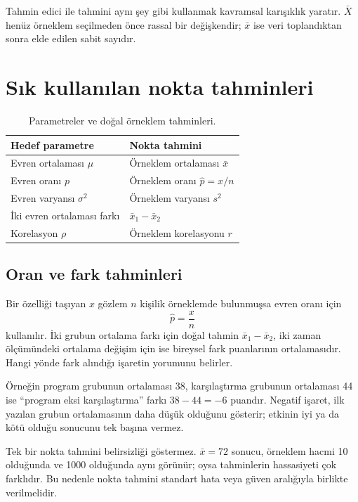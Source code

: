 \begin{mistakebox}
Tahmin edici ile tahmini aynı şey gibi kullanmak kavramsal karışıklık yaratır.
$\bar X$ henüz örneklem seçilmeden önce rassal bir değişkendir; $\bar x$ ise
veri toplandıktan sonra elde edilen sabit sayıdır.
\end{mistakebox}

\section{Sık kullanılan nokta tahminleri}

\begin{table}[htbp]
\centering
\caption{Parametreler ve doğal örneklem tahminleri.}
\begin{tabular}{p{}p{}}
\toprule
Hedef parametre & Nokta tahmini \\
\midrule
Evren ortalaması $\mu$ & Örneklem ortalaması $\bar x$ \\
Evren oranı $p$ & Örneklem oranı $\hat p=x/n$ \\
Evren varyansı $\sigma^2$ & Örneklem varyansı $s^2$ \\
İki evren ortalaması farkı & $\bar x_1-\bar x_2$ \\
Korelasyon $\rho$ & Örneklem korelasyonu $r$ \\
\bottomrule
\end{tabular}
\end{table}

\subsection{Oran ve fark tahminleri}

Bir özelliği taşıyan $x$ gözlem $n$ kişilik örneklemde bulunmuşsa evren oranı
için
\[
\hat p=\frac{x}{n}
\]
kullanılır. İki grubun ortalama farkı için doğal tahmin
$\bar x_1-\bar x_2$, iki zaman ölçümündeki ortalama değişim için ise bireysel
fark puanlarının ortalamasıdır. Hangi yönde fark alındığı işaretin yorumunu
belirler.

Örneğin program grubunun ortalaması 38, karşılaştırma grubunun ortalaması 44
ise ``program eksi karşılaştırma'' farkı $38-44=-6$ puandır. Negatif işaret,
ilk yazılan grubun ortalamasının daha düşük olduğunu gösterir; etkinin iyi ya
da kötü olduğu sonucunu tek başına vermez.

Tek bir nokta tahmini belirsizliği göstermez. $\bar x=72$ sonucu, örneklem
hacmi 10 olduğunda ve 1000 olduğunda aynı görünür; oysa tahminlerin hassasiyeti
çok farklıdır. Bu nedenle nokta tahmini standart hata veya güven aralığıyla
birlikte verilmelidir.

